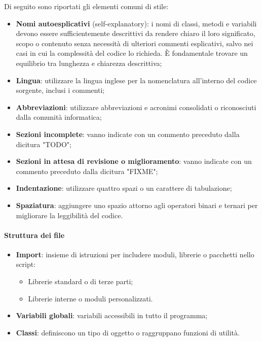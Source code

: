 \par Di seguito sono riportati gli elementi comuni di stile:
\begin{itemize}
  \item \textbf{Nomi autoesplicativi} (self-explanatory): i nomi di classi, metodi e variabili devono essere sufficientemente descrittivi da rendere chiaro il loro significato, scopo o contenuto senza necessità di ulteriori commenti esplicativi, salvo nei casi in cui la complessità del codice lo richieda. È fondamentale trovare un equilibrio tra lunghezza e chiarezza descrittiva;
  \item \textbf{Lingua}: utilizzare la lingua inglese per la nomenclatura all'interno del codice sorgente, inclusi i commenti;
  \item \textbf{Abbreviazioni}: utilizzare abbreviazioni e acronimi consolidati o riconosciuti dalla comunità informatica;
  \item \textbf{Sezioni incomplete}: vanno indicate con un commento preceduto dalla dicitura "TODO";
  \item \textbf{Sezioni in attesa di revisione o miglioramento}: vanno indicate con un commento preceduto dalla dicitura "FIXME";
  \item \textbf{Indentazione}: utilizzare quattro spazi o un carattere di tabulazione;
  \item \textbf{Spaziatura}: aggiungere uno spazio attorno agli operatori binari e ternari per migliorare la leggibilità del codice.
\end{itemize}

\paragraph*{Struttura dei file}
\begin{itemize}
  \item \textbf{Import}: insieme di istruzioni per includere moduli, librerie o pacchetti nello script:
  \begin{itemize}
    \item Librerie standard o di terze parti;
    \item Librerie interne o moduli personalizzati.
  \end{itemize}
  \item \textbf{Variabili globali}: variabili accessibili in tutto il programma;
  \item \textbf{Classi}: definiscono un tipo di oggetto o raggruppano funzioni di utilità.
\end{itemize}


